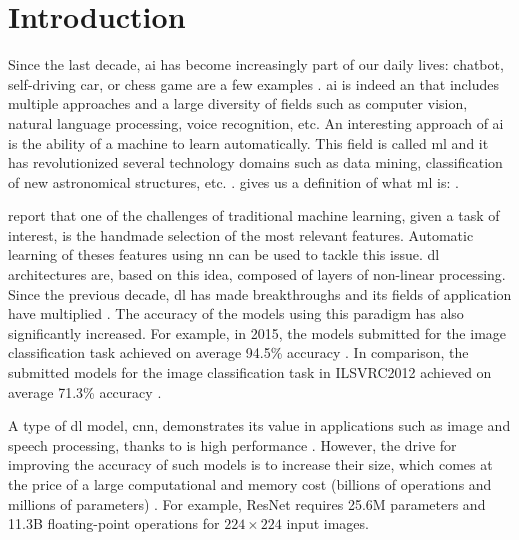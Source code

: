 \chapter*{Introduction} \label{chap:intr}
%
%
Since the last decade, \acrfull{ai} has become increasingly part of our daily lives: chatbot, self-driving car, or chess game are a few examples \cite{russell_artificial_2009}. \acrshort{ai} is indeed an  that includes multiple approaches and a large diversity of fields such as computer vision, natural language processing, voice recognition, etc. An interesting approach of \acrshort{ai} is the ability of a machine to learn automatically. This field is called \acrfull{ml} and it has revolutionized several technology domains such as data mining, classification of new astronomical structures, etc. \cite{alom_history_2018, mitchell_machine_1997}. \textcite{mitchell_machine_1997} gives us a definition of what \acrshort{ml} is: .

\textcite{arnold_introduction_2011} report that one of the challenges of traditional machine learning, given a task of interest, is the handmade selection of the most relevant features. Automatic learning of theses features using \acrfull{nn} can be used to tackle this issue. \acrfull{dl} architectures are, based on this idea, composed of layers of non-linear processing. Since the previous decade, \acrshort{dl} has made breakthroughs and its fields of application have multiplied \cite{wason_deep_2018}. The accuracy of the models using this paradigm has also significantly increased. For example, in 2015, the models submitted for the image classification task achieved on average 94.5\% accuracy \cite{russakovsky_imagenet_2015}. In comparison, the submitted models for the image classification task in ILSVRC2012 achieved on average 71.3\% accuracy \cite{noauthor_imagenet_nodate}.

A type of \acrshort{dl} model, \acrfull{cnn}, demonstrates its value in applications such as image and speech processing, thanks to is high performance \cite{shawahna_fpga-based_2019}. However, the drive for improving the accuracy of such models is to increase their size, which comes at the price of a large computational and memory cost (billions of operations and millions of parameters) \cite{szegedy_going_2015, khan_survey_2020}. For example, ResNet \cite{he_deep_2016} requires 25.6M parameters and 11.3B floating-point operations for $224 \times 224$ input images.

